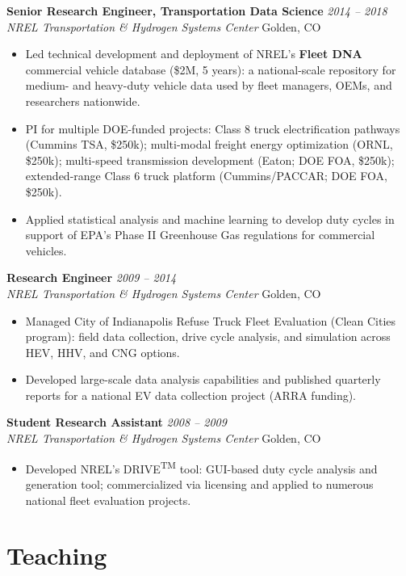 \documentclass[11pt,letterpaper]{article}
\newcommand{\cventry}[4]{%
  \noindent\textbf{#1} \hfill \textit{#2}\\
  \textit{#3} \hfill #4\vspace{3pt}}
\begin{document}
\medskip
\cventry{Senior Research Engineer, Transportation Data Science}{2014 -- 2018}
  {NREL Transportation \& Hydrogen Systems Center}{Golden, CO}
\begin{itemize}
  \item Led technical development and deployment of NREL's \textbf{Fleet DNA} commercial
        vehicle database (\$2M, 5 years): a national-scale repository for medium- and
        heavy-duty vehicle data used by fleet managers, OEMs, and researchers nationwide.
  \item PI for multiple DOE-funded projects: Class 8 truck electrification pathways
        (Cummins TSA, \$250k); multi-modal freight energy optimization (ORNL, \$250k);
        multi-speed transmission development (Eaton; DOE FOA, \$250k); extended-range
        Class 6 truck platform (Cummins/PACCAR; DOE FOA, \$250k).
  \item Applied statistical analysis and machine learning to develop duty cycles
        in support of EPA's Phase II Greenhouse Gas regulations for commercial vehicles.
\end{itemize}

\medskip
\cventry{Research Engineer}{2009 -- 2014}
  {NREL Transportation \& Hydrogen Systems Center}{Golden, CO}
\begin{itemize}
  \item Managed City of Indianapolis Refuse Truck Fleet Evaluation (Clean Cities program):
        field data collection, drive cycle analysis, and simulation across HEV, HHV, and
        CNG options.
  \item Developed large-scale data analysis capabilities and published quarterly reports
        for a national EV data collection project (ARRA funding).
\end{itemize}

\medskip
\cventry{Student Research Assistant}{2008 -- 2009}
  {NREL Transportation \& Hydrogen Systems Center}{Golden, CO}
\begin{itemize}
  \item Developed NREL's DRIVE\textsuperscript{TM} tool: GUI-based duty cycle analysis
        and generation tool; commercialized via licensing and applied to numerous national
        fleet evaluation projects.
\end{itemize}

\section{Teaching}
\end{document}
